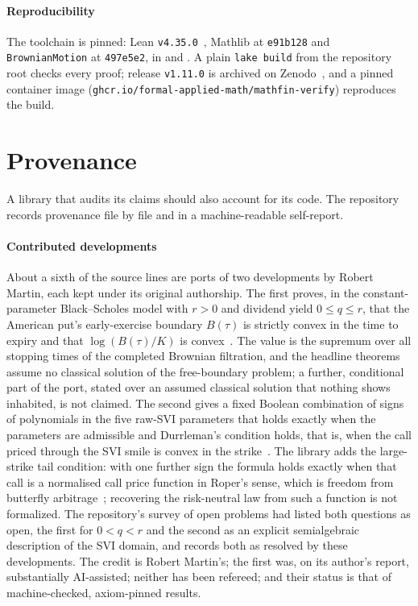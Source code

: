 \documentclass[11pt]{article}
\begin{document}
\paragraph{Reproducibility}
The toolchain is pinned: Lean \texttt{v4.35.0}~\cite{deMouraUllrich2021}, Mathlib at \texttt{e91b128} and
\texttt{BrownianMotion} at \texttt{497e5e2}, in  and . A plain \texttt{lake build}
from the repository root checks every proof; release \texttt{v1.11.0} is archived on Zenodo~\cite{Zenodo}, and a pinned container
image (\texttt{ghcr.io/formal-applied-math/mathfin-verify}) reproduces the build.

\section{Provenance}\label{sec:provenance}

A library that audits its claims should also account for its code. The repository records provenance file by file and in a
machine-readable self-report.

\paragraph{Contributed developments}
About a sixth of the source lines are ports of two developments by Robert Martin, each kept under its original authorship. The first
proves, in the constant-parameter Black--Scholes model with $r>0$ and dividend yield $0\le q\le r$, that the American put's
early-exercise boundary $B(\tau)$ is strictly convex in the time to expiry and that $\log(B(\tau)/K)$ is
convex~\cite{MartinAmericanPut}. The value is the supremum over all stopping times of the completed Brownian filtration, and the
headline theorems assume no classical solution of the free-boundary problem; a further, conditional part of the port, stated over
an assumed classical solution that nothing shows inhabited, is not claimed. The second gives a fixed Boolean combination of signs
of polynomials in the five raw-SVI parameters that holds exactly when the parameters are admissible and Durrleman's condition
holds, that is, when the call priced through the SVI smile is convex in the strike~\cite{MartinSVI,GatheralJacquier2014}. The
library adds the large-strike tail condition: with one further sign the formula holds exactly when that call is a normalised call
price function in Roper's sense, which is freedom from butterfly arbitrage~\cite{Roper2010}; recovering the risk-neutral law from
such a function is not formalized.
The repository's survey of open problems had listed both questions as open, the first for $0<q<r$ and the second as an explicit
semialgebraic description of the SVI domain, and records both as resolved by these developments. The credit is Robert Martin's;
the first was, on its author's report, substantially AI-assisted; neither has been refereed; and their status is that of
machine-checked, axiom-pinned results.
\end{document}

